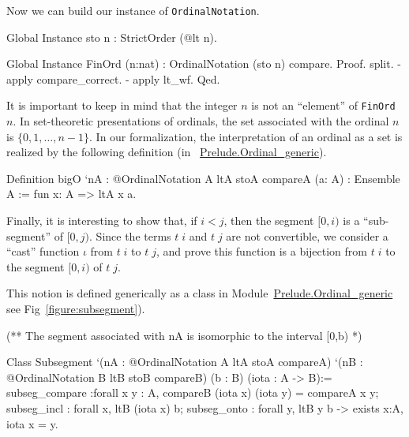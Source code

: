 Now we can build our instance of \texttt{OrdinalNotation}.

\begin{Coqsrc}
Global Instance sto n : StrictOrder (@lt n).

Global Instance FinOrd (n:nat) : OrdinalNotation (sto n) compare.
Proof.
  split.
  - apply compare_correct.
  - apply lt_wf.
Qed.
\end{Coqsrc}

\begin{remark}
It is important to keep in mind  that the integer $n$ is not an ``element'' of \texttt{FinOrd $n$}. In set-theoretic presentations of ordinals, the set associated with the ordinal $n$ is $\{0,1,\dots,n-1\}$. 
In our formalization, the interpretation of an ordinal as a set is realized by the following definition
(in ~\href{../src/html/hydras.Prelude.Ordinal_generic.html}{Prelude.Ordinal\_generic}).

\begin{Coqsrc}
Definition bigO `{nA : @OrdinalNotation A ltA stoA compareA}
           (a: A) : Ensemble A :=
  fun x: A => ltA x a.
\end{Coqsrc}
\end{remark}



Finally, it is interesting to show that, if $i<j$, then the segment $[0,i)$ is a ``sub-segment'' of
$[0,j)$. Since the terms  $t\;i$ and $t\;j$ are not convertible, we consider a ``cast'' 
function $\iota$ from $t\;i$ to $t\;j$, and prove this function is  a bijection  from $t\;i$ to
the segment $[0,i)$ of $t\;j$.




This notion is defined generically as a class in
 Module~\href{../src/html/hydras.Prelude.Ordinal-generic.html}{Prelude.Ordinal\_generic} see Fig~\vref{figure:subsegment}).

\begin{Coqsrc}
(** The segment associated with nA is isomorphic to
    the interval [0,b) *)

Class  Subsegment 
       `(nA : @OrdinalNotation A ltA stoA compareA)
       `(nB : @OrdinalNotation B ltB stoB compareB)
       (b :  B)
       (iota : A -> B):=
  {
  subseg_compare :forall x y : A,  compareB (iota x) (iota y) =
                                 compareA x y;
  subseg_incl : forall x, ltB (iota x) b;
  subseg_onto : forall y, ltB y b  -> exists x:A, iota x = y}.
\end{Coqsrc}


